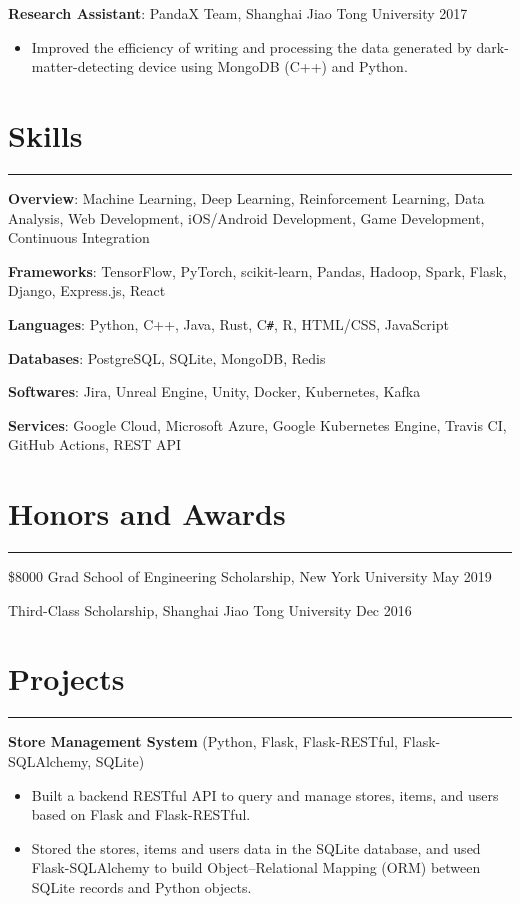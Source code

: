 \documentclass{article}
\begin{document}
\textbf{Research Assistant}: PandaX Team, Shanghai Jiao Tong University \hfill
2017

\begin{itemize}[nosep]
	\item Improved the efficiency of writing and processing the data generated by dark-matter-detecting device using
	MongoDB (C++) and Python.
\end{itemize}

\section{Skills}
\hrule
\vspace{1em}

\textbf{Overview}: Machine Learning, Deep Learning, Reinforcement Learning, Data Analysis, Web Development,
iOS/Android Development, Game Development, Continuous Integration

\textbf{Frameworks}: TensorFlow, PyTorch, scikit-learn, Pandas, Hadoop, Spark, Flask, Django, Express.js, React

\textbf{Languages}: Python, C++, Java, Rust, C\texttt{\#}, R, HTML/CSS, JavaScript

\textbf{Databases}: PostgreSQL, SQLite, MongoDB, Redis

\textbf{Softwares}: Jira, Unreal Engine, Unity, Docker, Kubernetes, Kafka

\textbf{Services}: Google Cloud, Microsoft Azure, Google Kubernetes Engine, Travis CI, GitHub Actions, REST API

\section{Honors and Awards}
\hrule
\vspace{1em}

\$8000 Grad School of Engineering Scholarship, New York University \hfill
May 2019

Third-Class Scholarship, Shanghai Jiao Tong University \hfill
Dec 2016

\section{Projects}
\hrule
\vspace{1em}

\textbf{Store Management System} (Python, Flask, Flask-RESTful, Flask-SQLAlchemy, SQLite)

\begin{itemize}[nosep]
	\item Built a backend RESTful API to query and manage stores, items, and users based on Flask and Flask-RESTful.
	\item Stored the stores, items and users data in the SQLite database, and used Flask-SQLAlchemy to build Object–Relational Mapping (ORM) between SQLite records and Python objects.
\end{itemize}
\end{document}
